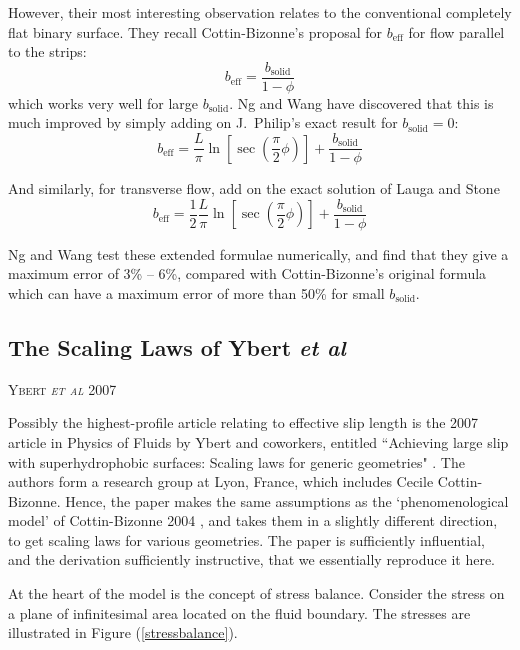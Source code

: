 \documentclass[12pt, a4paper, twoside, openright]{book}
\newcommand{\beff}{\ensuremath{b_{\mathrm{eff}}}}
\newcommand{\paper}[1]
         {\colorbox[gray]{0.8}{ \textsc{#1}}
         
         }
\begin{document}
However, their most interesting observation relates to the conventional completely flat binary surface.  They recall Cottin-Bizonne's proposal for $\beff$ for flow parallel to the strips:
\begin{equation}
\beff = \frac{b_{\mathrm{solid}}}{1 - \phi}
\end{equation}
which works very well for large $b_{\mathrm{solid}}$.  Ng and Wang have discovered that this is much improved by simply adding on J.\ Philip's exact result \cite{Philip1972} for $b_{\mathrm{solid}}=0$:
\begin{equation}
\beff =  \frac{L}{\pi} \ln \left[ \sec \left( \frac{\pi}{2} \phi \right) \right] +
 \frac{b_{\mathrm{solid}}}{1 - \phi}
\end{equation}

And similarly, for transverse flow, add on the exact solution of Lauga and Stone \cite{LaugaStone2003}
\begin{equation}
\beff = \frac{1}{2}  \frac{L}{\pi} \ln \left[ \sec \left( \frac{\pi}{2} \phi \right) \right] +
 \frac{b_{\mathrm{solid}}}{1 - \phi}
\end{equation}

Ng and Wang test these extended formulae numerically, and find that they give a maximum error of 3\% -- 6\%, compared with Cottin-Bizonne's original formula which can have a maximum error of more than 50\% for small $b_{\mathrm{solid}}$.

\clearpage
\subsection{The Scaling Laws of Ybert \emph{et al}}

\paper{Ybert \emph{et al} 2007}
Possibly the highest-profile article relating to effective slip length is the 2007 article in Physics of Fluids by Ybert and coworkers, entitled ``Achieving large slip with superhydrophobic surfaces: Scaling laws for generic geometries" \cite{Ybert2007}. The authors form a research group at Lyon, France, which includes Cecile Cottin-Bizonne.  Hence, the paper makes the same assumptions as the `phenomenological model' of Cottin-Bizonne 2004 \cite{Cottin-Bizonne2004}, and takes them in a slightly different direction, to get scaling laws for various geometries.
The paper is sufficiently influential, and the derivation sufficiently instructive, that we essentially reproduce it here.

At the heart of the model is the concept of stress balance.  Consider the stress on a plane of infinitesimal area located on the fluid boundary.  The stresses are illustrated in Figure (\ref{stressbalance}).
\end{document}

